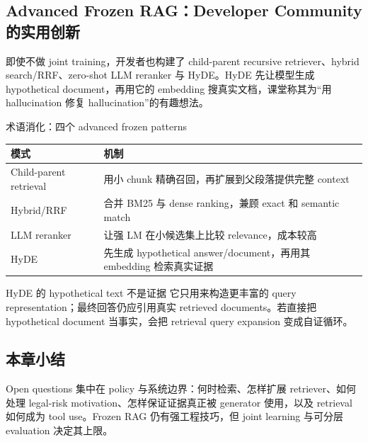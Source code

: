 \subsection{Advanced Frozen RAG：Developer Community 的实用创新}

即使不做 joint training，开发者也构建了 child-parent recursive retriever、hybrid search/RRF、zero-shot LLM reranker 与 HyDE。HyDE 先让模型生成 hypothetical document，再用它的 embedding 搜真实文档，课堂称其为“用 hallucination 修复 hallucination”的有趣想法。


\begin{knowledgebox}{术语消化：四个 advanced frozen patterns}
\begin{tabularx}{\textwidth}{L{0.25\textwidth}>{\raggedright\arraybackslash}X}
\toprule
模式 & 机制 \\
\midrule
Child-parent retrieval & 用小 chunk 精确召回，再扩展到父段落提供完整 context \\
Hybrid/RRF & 合并 BM25 与 dense ranking，兼顾 exact 和 semantic match \\
LLM reranker & 让强 LM 在小候选集上比较 relevance，成本较高 \\
HyDE & 先生成 hypothetical answer/document，再用其 embedding 检索真实证据 \\
\bottomrule
\end{tabularx}
\end{knowledgebox}

\begin{warningbox}{HyDE 的 hypothetical text 不是证据}
它只用来构造更丰富的 query representation；最终回答仍应引用真实 retrieved documents。若直接把 hypothetical document 当事实，会把 retrieval query expansion 变成自证循环。
\end{warningbox}


\subsection{本章小结}

Open questions 集中在 policy 与系统边界：何时检索、怎样扩展 retriever、如何处理 legal-risk motivation、怎样保证证据真正被 generator 使用，以及 retrieval 如何成为 tool use。Frozen RAG 仍有强工程技巧，但 joint learning 与可分层 evaluation 决定其上限。

